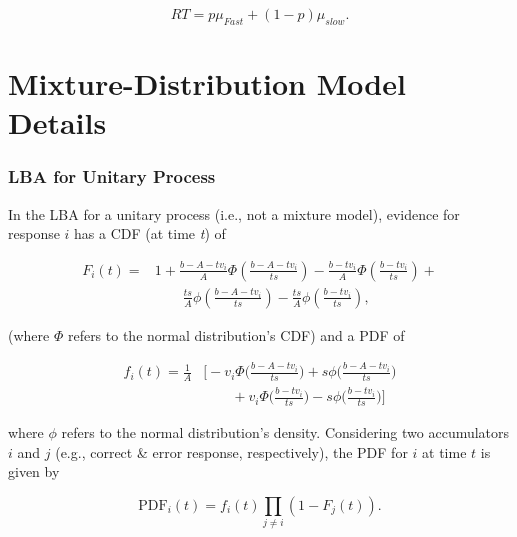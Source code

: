 \documentclass[a4paper, jou, natbib]{apa6}
\begin{document}
\begin{equation}
RT = p\mu_{Fast} + (1 - p)\mu_{slow}.
\label{eq:tdMixtureNew}
\end{equation}
\appendix
\section{Mixture-Distribution Model Details}

\subsubsection{LBA for Unitary Process}
In the LBA for a unitary process (i.e., not a mixture model), evidence for response $i$ has a CDF (at time \emph{t}) of

\begin{equation}
\begin{aligned}
F_{i}(t) = & 1 + \frac{b - A - tv_{i}}{A} \Phi\left(\frac{b - A - tv_{i}}{ts}\right) - 
\frac{b - tv_{i}}{A} \Phi\left(\frac{b - tv_{i}}{ts}\right) + \\ 
&\qquad \frac{ts}{A} \phi \left(\frac{b - A - tv_{i}}{ts}\right) - \frac{ts}{A} \phi \left(\frac{b - tv_{i}}{ts}\right),
\end{aligned}
\label{eq:lbaCDF}
\end{equation}

\noindent (where $\Phi$ refers to the normal distribution's CDF) and a PDF of 

\begin{equation}
\begin{aligned}
f_{i}(t) = \frac{1}{A} & \Biggl[-v_{i}\Phi \Biggl(\frac{b - A - tv_{i}}{ts}\Biggr) + s\phi\Biggl(\frac{b - A - tv_{i}}{ts}\Biggr) \\
&\qquad + v_{i}\Phi \Biggl(\frac{b - tv_{i}}{ts}\Biggr) - s\phi\Biggl(\frac{b - tv_{i}}{ts}\Biggr)\Biggr] 
\end{aligned}
\label{eq:lbaPDF}
\end{equation}

\noindent where $\phi$ refers to the normal distribution's density. Considering two accumulators $i$ and $j$ (e.g., correct \& error response, respectively), the PDF for $i$ at time $t$ is given by

\begin{equation}
\mbox{PDF}_{i}(t) = f_{i}(t) \prod_{j \neq i} \left(1 - F_{j}(t)\right).
\label{eq:defectivePDF}
\end{equation}
\end{document}
